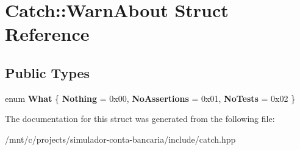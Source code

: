 \hypertarget{structCatch_1_1WarnAbout}{}\section{Catch\+:\+:Warn\+About Struct Reference}
\label{structCatch_1_1WarnAbout}
\subsection*{Public Types}
\begin{DoxyCompactItemize}
\item 
\mbox{\label{structCatch_1_1WarnAbout_ae3dde70ef78d700ea896eb29314e0fa3}} 
enum {\bfseries What} \{ {\bfseries Nothing} = 0x00, 
{\bfseries No\+Assertions} = 0x01, 
{\bfseries No\+Tests} = 0x02
 \}
\end{DoxyCompactItemize}


The documentation for this struct was generated from the following file\+:\begin{DoxyCompactItemize}
\item 
/mnt/c/projects/simulador-\/conta-\/bancaria/include/catch.\+hpp\end{DoxyCompactItemize}
